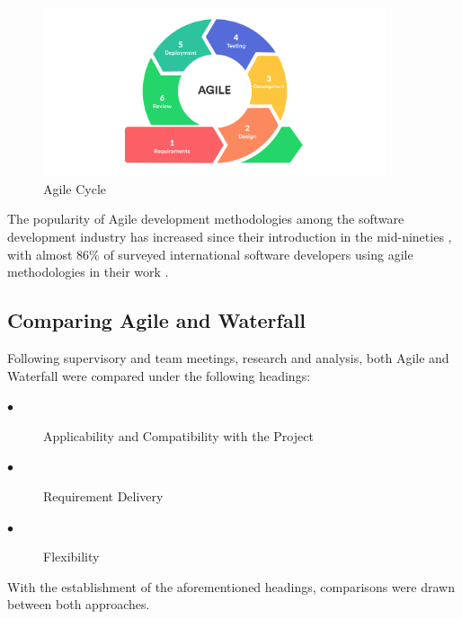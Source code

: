 \begin{figure}[H]
	\caption{Agile Cycle}
	\label{image:myImageName}
	\centering
	\includegraphics[width=0.9\textwidth]{images/agile.png}
\end{figure}	

The popularity of Agile development methodologies among the software development industry has increased since their introduction in the mid-nineties \cite{AGILE_SURVEY}, with almost 86\% of surveyed international software developers using agile methodologies in their work \cite{AGILE_SURVEY_TWO}.

\subsection{Comparing Agile and Waterfall}
Following supervisory and team meetings, research and analysis, both Agile and Waterfall were compared under the following headings:

\begin{description}
  \item[$\bullet$] Applicability and Compatibility with the Project
  \item[$\bullet$] Requirement Delivery
  \item[$\bullet$] Flexibility
\end{description}

With the establishment of the aforementioned headings, comparisons were drawn between both approaches.

